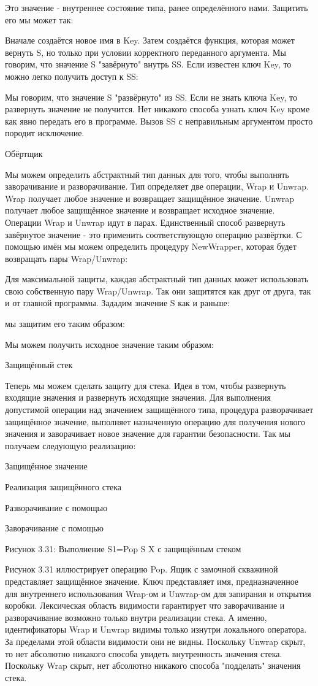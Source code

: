 Это значение - внутреннее состояние типа, ранее определённого нами. Защитить его мы может так:

Вначале создаётся новое имя в Key. Затем создаётся функция, которая может вернуть S, но только при условии корректного переданного аргумента. Мы говорим, что значение S "завёрнуто" внутрь SS. Если известен ключ Key, то можно легко получить доступ к SS:

Мы говорим, что значение S "развёрнуто" из SS. Если не знать ключа Key, то развернуть значение не получится. Нет никакого способа узнать ключ Key кроме как явно передать его в программе. Вызов SS с неправильным аргументом просто породит исключение.

Обёртщик

Мы можем определить абстрактный тип данных для того, чтобы выполнять заворачивание и разворачивание. Тип определяет две операции, Wrap и Unwrap. Wrap получает любое значение и возвращает защищённое значение. Unwrap получает любое защищённое значение и возвращает исходное значение. Операции Wrap и Unwrap идут в парах. Единственный способ развернуть завёрнутое значение - это применить соответствующую операцию развёртки. С помощью имён мы можем определить процедуру NewWrapper, которая будет возвращать пары Wrap/Unwrap:

Для максимальной защиты, каждая абстрактный тип данных может использовать свою собственную пару Wrap/Unwrap. Так они защитятся как друг от друга, так и от главной программы. Зададим значение S как и раньше:

мы защитим его таким образом:

Мы можем получить исходное значение таким образом:

Защищённый стек

Теперь мы можем сделать защиту для стека. Идея в том, чтобы развернуть входящие значения и развернуть исходящие значения. Для выполнения допустимой операции над значением защищённого типа, процедура разворачивает защищённое значение, выполняет назначенную операцию для получения нового значения и заворачивает новое значение для гарантии безопасности. Так мы получаем следующую реализацию:

Защищённое значение

Реализация защищённого стека

Разворачивание с помощью

Заворачивание с помощью

Рисунок 3.31: Выполнение S1={Pop S X} с защищённым стеком

Рисунок 3.31 иллюстрирует операцию Pop. Ящик с замочной скважиной представляет защищённое значение. Ключ представляет имя, предназначенное для внутреннего использования Wrap-ом и Unwrap-ом для запирания и открытия коробки. Лексическая область видимости гарантирует что заворачивание и разворачивание возможно только внутри реализации стека. А именно, идентификаторы Wrap и Unwrap видимы только изнутри локального оператора. За пределами этой области видимости они не видны. Поскольку Unwrap скрыт, то нет абсолютно никакого способа увидеть внутренность значения стека. Поскольку Wrap скрыт, нет абсолютно никакого способа "подделать" значения стека.

